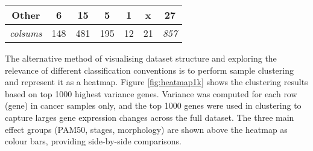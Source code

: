 \begin{table}[!h]
\begin{tabular}{ccccccc}
                \multicolumn{1}{c|}{\textbf{Other}} & \multicolumn{1}{c|}{6} & \multicolumn{1}{c|}{15} & \multicolumn{1}{c|}{5} & \multicolumn{1}{c|}{1} & \multicolumn{1}{c|}{{\color[HTML]{C0C0C0} x}} & \multicolumn{1}{c|}{27} \\ \hline
                \multicolumn{1}{c|}{{\color[HTML]{9B9B9B} \textit{colsums}}} & \multicolumn{1}{c|}{148} & \multicolumn{1}{c|}{481} & \multicolumn{1}{c|}{195} & \multicolumn{1}{c|}{12} & \multicolumn{1}{c|}{21} & \multicolumn{1}{c|}{\textit{857}} \\ \cline{2-7} 
                \end{tabular}%
                \end{table}
        

    The alternative method of visualising dataset structure and exploring the relevance of different classification conventions is to perform sample clustering and represent it as a heatmap. Figure \ref{fig:heatmap1k} shows the clustering results based on top 1000 highest variance genes. Variance was computed for each row (gene) in cancer samples only, and the top 1000 genes were used in clustering to capture larges gene expression changes across the full dataset. The three main effect groups (PAM50, stages, morphology) are shown above the heatmap as colour bars, providing side-by-side comparisons.     
    
